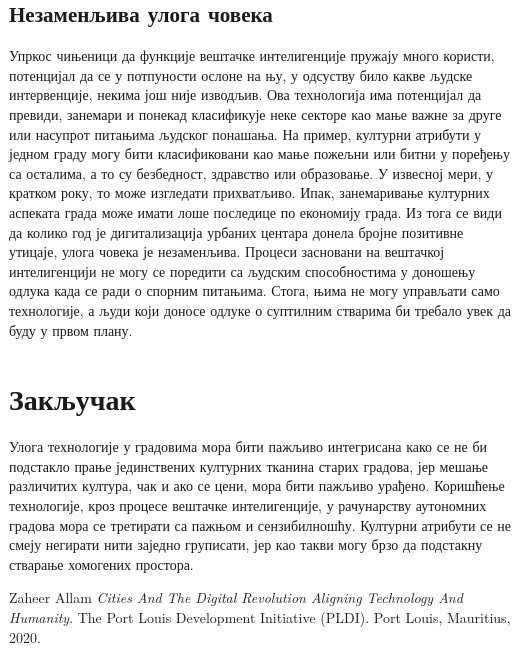 \documentclass{article}
\begin{document}
\subsection{Незаменљива улога човека}
Упркос чињеници да функције вештачке интелигенције пружају много користи, потенцијал да се у потпуности ослоне на њу, у одсуству било какве људске интервенције, некима још није изводљив. Ова технологија има потенцијал да превиди, занемари и понекад класификује неке секторе као мање важне за друге или насупрот питањима људског понашања. На пример, културни атрибути у једном граду могу бити класификовани као мање пожељни или битни у поређењу са осталима, а то су безбедност, здравство или образовање. У извесној мери, у кратком року, то може изгледати прихватљиво. Ипак, занемаривање културних аспеката града може имати лоше последице по економију града. Из тога се види да колико год је дигитализација урбаних центара донела бројне позитивне утицаје, улога човека је незаменљива. Процеси засновани на вештачкој интелигенцији не могу се поредити са људским способностима у доношењу одлука када се ради о спорним питањима. Стога, њима не могу управљати само технологије, а људи који доносе одлуке о суптилним стварима би требало увек да буду у првом плану.

\section{Закључак}

Улога технологије у градовима мора бити пажљиво интегрисана како се не би подстакло прање јединствених културних тканина старих градова, јер мешање различитих култура, чак и ако се цени, мора бити пажљиво урађено. Коришћење технологије, кроз процесе вештачке интелигенције, у рачунарству аутономних градова мора се третирати са пажњом и сензибилношћу. Културни атрибути се не смеју негирати нити заједно груписати, јер као такви могу брзо да подстакну стварање хомогених простора. 

\appendix

\iffalse


\fi

\begin{thebibliography}{1}

\bibitem{} Zaheer Allam \emph{Cities And The Digital Revolution Aligning Technology And Humanity}. 
The Port Louis Development Initiative (PLDI). Port Louis, Mauritius, 2020.

\end{thebibliography}
\end{document}
